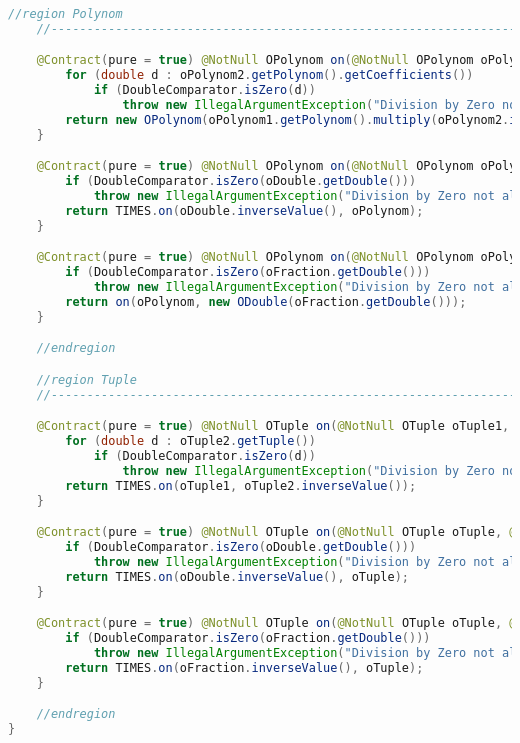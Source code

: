 \begin{lstlisting}[caption=Slash (Schwenke),label=list:Slash,language=Java]
    //region Polynom
    //------------------------------------------------------------------------------------

    @Contract(pure = true) @NotNull OPolynom on(@NotNull OPolynom oPolynom1, @NotNull OPolynom oPolynom2) {
        for (double d : oPolynom2.getPolynom().getCoefficients())
            if (DoubleComparator.isZero(d))
                throw new IllegalArgumentException("Division by Zero not allowed");
        return new OPolynom(oPolynom1.getPolynom().multiply(oPolynom2.inverseValue().getPolynom()));
    }

    @Contract(pure = true) @NotNull OPolynom on(@NotNull OPolynom oPolynom, @NotNull ODouble oDouble) {
        if (DoubleComparator.isZero(oDouble.getDouble()))
            throw new IllegalArgumentException("Division by Zero not allowed");
        return TIMES.on(oDouble.inverseValue(), oPolynom);
    }

    @Contract(pure = true) @NotNull OPolynom on(@NotNull OPolynom oPolynom, @NotNull OFraction oFraction) {
        if (DoubleComparator.isZero(oFraction.getDouble()))
            throw new IllegalArgumentException("Division by Zero not allowed");
        return on(oPolynom, new ODouble(oFraction.getDouble()));
    }

    //endregion

    //region Tuple
    //------------------------------------------------------------------------------------

    @Contract(pure = true) @NotNull OTuple on(@NotNull OTuple oTuple1, @NotNull OTuple oTuple2) {
        for (double d : oTuple2.getTuple())
            if (DoubleComparator.isZero(d))
                throw new IllegalArgumentException("Division by Zero not allowed");
        return TIMES.on(oTuple1, oTuple2.inverseValue());
    }

    @Contract(pure = true) @NotNull OTuple on(@NotNull OTuple oTuple, @NotNull ODouble oDouble) {
        if (DoubleComparator.isZero(oDouble.getDouble()))
            throw new IllegalArgumentException("Division by Zero not allowed");
        return TIMES.on(oDouble.inverseValue(), oTuple);
    }

    @Contract(pure = true) @NotNull OTuple on(@NotNull OTuple oTuple, @NotNull OFraction oFraction) {
        if (DoubleComparator.isZero(oFraction.getDouble()))
            throw new IllegalArgumentException("Division by Zero not allowed");
        return TIMES.on(oFraction.inverseValue(), oTuple);
    }

    //endregion
}
\end{lstlisting}    

